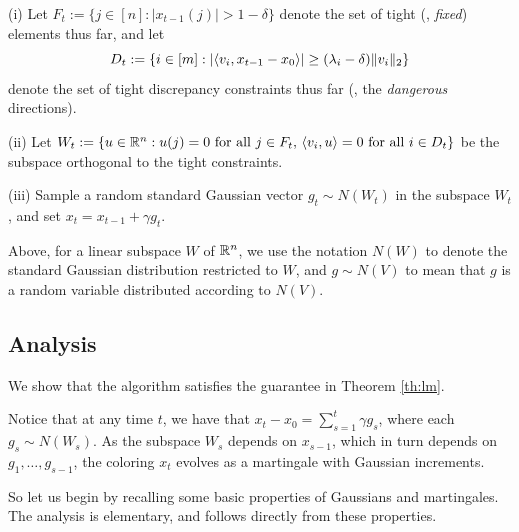 \smallskip

(i) Let 
$F_{t}:=\{j \in [n]: |x_{t-1}(j)|> 1-\delta \}$
denote the set of tight (\ie, \emph{fixed}) elements thus far, and let \[D_t := \{i \in [m]: |\langle v_i,x_{t-1}-x_0\rangle| \geq  (\lambda_i -\delta)\|v_i\|_2 \}\] denote the set of tight discrepancy constraints thus far (\ie, the \emph{dangerous} directions).

\smallskip

(ii) Let $W_t := \{ u \in \mathbb{R}^n: u(j)=0 \text{ for all } j \in F_t,\, \langle v_i,u\rangle=0 \text{ for all } i \in D_t\}$
be the subspace orthogonal to the tight constraints.

\smallskip 
(iii) 
Sample a random standard Gaussian vector  $g_t \sim N(W_t)$  in the subspace $W_t$, and set  $x_t = x_{t-1} + \gamma g_t$.

Above, for a linear subspace $W$ of $\mathbb{R}^n$, we use the notation $N(W)$ to denote the standard Gaussian distribution restricted to $W$, and $g \sim N(V)$ to mean that $g$ is a random variable distributed according to $N(V)$. 


\subsection{Analysis}
We show that the algorithm satisfies the guarantee in Theorem \ref{th:lm}. 

Notice that at any time $t$, we have that $x_t-x_0 = \sum_{s=1}^t \gamma g_{s}$, where each $g_s \sim N(W_s)$. As the subspace $W_s$ depends on $x_{s-1}$, which in turn depends on $g_1,\ldots,g_{s-1}$, the coloring $x_t$ evolves as a martingale with Gaussian increments.

So let us begin by recalling some basic properties of Gaussians and martingales. The analysis is elementary, and follows directly from these properties. 



